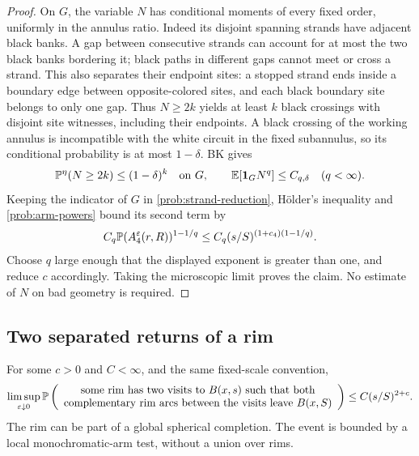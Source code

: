 \begin{proof}
On $G$, the variable $N$ has conditional moments of every fixed order,
uniformly in the annulus ratio.  Indeed its disjoint spanning strands
have adjacent black banks.  A gap between consecutive strands can
account for at most the two black banks bordering it; black paths in
different gaps cannot meet or cross a strand.  This also separates their
endpoint sites: a stopped strand ends inside a boundary edge between
opposite-colored sites, and each black boundary site belongs to only one
gap.  Thus $N\ge2k$ yields at least $k$ black crossings with disjoint
site witnesses, including their endpoints.  A black crossing of the
working annulus is incompatible with the white circuit in the fixed
subannulus, so its conditional probability
is at most $1-\delta$.  BK gives
\[
 \mathbb P^{\eta}(N\ge2k)\le(1-\delta)^k\quad\text{on }G,
 \qquad
 \mathbb E[\mathbf 1_GN^q]\le C_{q,\delta}\quad(q<\infty).
\]
Keeping the indicator of $G$ in \eqref{prob:strand-reduction}, H\"older's
inequality and \eqref{prob:arm-powers} bound its second term by
\[
 C_q\mathbb P(A_4^\varepsilon(r,R))^{1-1/q}
 \le C_q(s/S)^{(1+c_4)(1-1/q)}.
\]
Choose $q$ large enough that the displayed exponent is greater than one,
and reduce $c$ accordingly.  Taking the microscopic limit proves the
claim.  No estimate of $N$ on bad geometry is required.
\end{proof}

\subsection{Two separated returns of a rim}

\begin{lemma}\label{lemma:near-return}
For some $c>0$ and $C<\infty$, and the same fixed-scale convention,
\begin{equation}\label{prob:near-return}
 \limsup_{\varepsilon\downarrow0}
 \mathbb P\left(\begin{array}{c}
 \text{some rim has two visits to }B(x,s)\text{ such that both}\\
 \text{complementary rim arcs between the visits leave }B(x,S)
 \end{array}\right)
 \le C(s/S)^{2+c}.
\end{equation}
The rim can be part of a global spherical completion.  The event is
bounded by a local monochromatic-arm test, without a union over rims.
\end{lemma}

